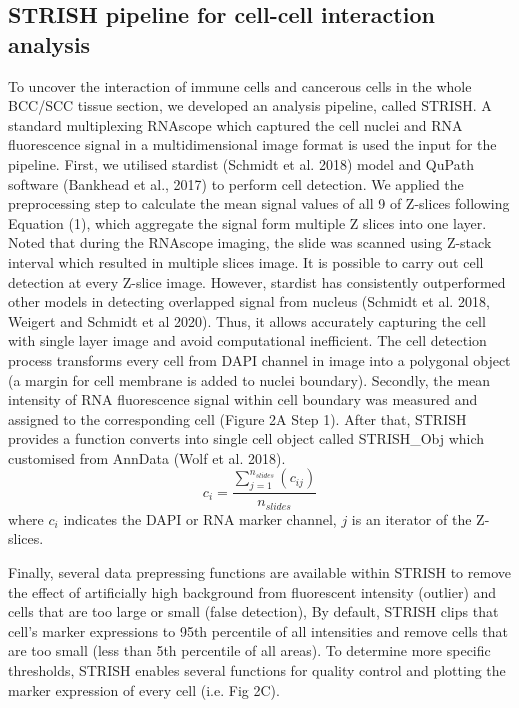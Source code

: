 \subsection{STRISH pipeline for cell-cell interaction analysis}
To uncover the interaction of immune cells and cancerous cells in the whole BCC/SCC tissue section, we developed an analysis pipeline, called STRISH. A standard multiplexing RNAscope which captured the cell nuclei and RNA fluorescence signal in a multidimensional image format is used the input for the pipeline. First, we utilised stardist (Schmidt et al. 2018) model and QuPath software (Bankhead et al., 2017) to perform cell detection. We applied the preprocessing step to calculate the mean signal values of all 9 of Z-slices following Equation (1), which aggregate the signal form multiple Z slices into one layer. Noted that during the RNAscope imaging, the slide was scanned using Z-stack interval which resulted in multiple slices image. It is possible to carry out cell detection at every Z-slice image. However, stardist has consistently outperformed other models in detecting overlapped signal from nucleus (Schmidt et al. 2018, Weigert and Schmidt et al 2020). Thus, it allows accurately capturing the cell with single layer image and avoid computational inefficient. The cell detection process transforms every cell from DAPI channel in image into a polygonal object (a margin for cell membrane is added to nuclei boundary). Secondly, the mean intensity of RNA fluorescence signal within cell boundary was measured and assigned to the corresponding cell (Figure 2A Step 1). After that, STRISH provides a function converts into single cell object called STRISH\_Obj which customised from AnnData (Wolf et al. 2018). 
\begin{equation}
c_{i} = \frac{\sum_{j=1}^{n_{slides}}(c_{ij})}{n_{slides}}
\end{equation}
where $c_i$ indicates the DAPI or RNA marker channel, $j$ is an iterator of the Z-slices.

Finally, several data prepressing functions are available within STRISH to remove the effect of artificially high background from fluorescent intensity (outlier) and cells that are too large or small (false detection), By default, STRISH clips that cell’s marker expressions to 95th percentile of all intensities and remove cells that are too small (less than 5th percentile of all areas). To determine more specific thresholds, STRISH enables several functions for quality control and plotting the marker expression of every cell (i.e. Fig 2C).

